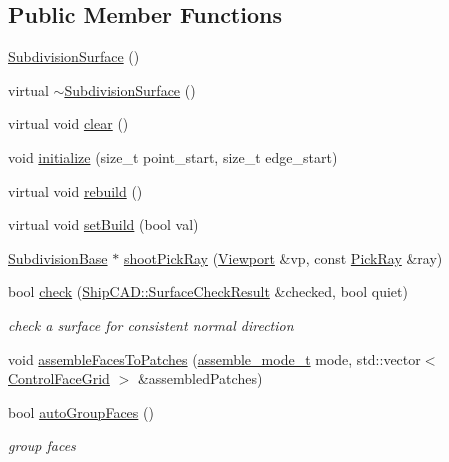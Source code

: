 \subsection*{Public Member Functions}
\begin{DoxyCompactItemize}
\item 
\hyperlink{classShipCAD_1_1SubdivisionSurface_a507ea9cd5354e1d14fe24d52da505934}{Subdivision\+Surface} ()
\item 
virtual \hyperlink{classShipCAD_1_1SubdivisionSurface_a4f1b66a4d9e9f8ac3dbd956e2113a594}{$\sim$\+Subdivision\+Surface} ()
\item 
virtual void \hyperlink{classShipCAD_1_1SubdivisionSurface_a80ab3bd6372a8465d69f71034a353e06}{clear} ()
\item 
void \hyperlink{classShipCAD_1_1SubdivisionSurface_a13cfd2714344c9b85aad8d123538db48}{initialize} (size\+\_\+t point\+\_\+start, size\+\_\+t edge\+\_\+start)
\item 
virtual void \hyperlink{classShipCAD_1_1SubdivisionSurface_a259856fc21f2bc1eebbc52f10dd59469}{rebuild} ()
\item 
virtual void \hyperlink{classShipCAD_1_1SubdivisionSurface_aec5073750762d1f8c3ab2107a742f4a5}{set\+Build} (bool val)
\item 
\hyperlink{classShipCAD_1_1SubdivisionBase}{Subdivision\+Base} $\ast$ \hyperlink{classShipCAD_1_1SubdivisionSurface_aee7768d40a54b2d22cf604dedeec4bbc}{shoot\+Pick\+Ray} (\hyperlink{classShipCAD_1_1Viewport}{Viewport} \&vp, const \hyperlink{structShipCAD_1_1PickRay}{Pick\+Ray} \&ray)
\item 
bool \hyperlink{classShipCAD_1_1SubdivisionSurface_a8092913bd49a8a98cf96ba9485758aaf}{check} (\hyperlink{structShipCAD_1_1SurfaceCheckResult}{Ship\+C\+A\+D\+::\+Surface\+Check\+Result} \&checked, bool quiet)
\begin{DoxyCompactList}\small\item\em check a surface for consistent normal direction \end{DoxyCompactList}\item 
void \hyperlink{classShipCAD_1_1SubdivisionSurface_ab14892e66e800a795e1af3dcc781af02}{assemble\+Faces\+To\+Patches} (\hyperlink{namespaceShipCAD_aaba70dc1c80dc540bef320cb9b720a20}{assemble\+\_\+mode\+\_\+t} mode, std\+::vector$<$ \hyperlink{structShipCAD_1_1ControlFaceGrid}{Control\+Face\+Grid} $>$ \&assembled\+Patches)
\item 
bool \hyperlink{classShipCAD_1_1SubdivisionSurface_a23fcec4dbb0650c37519b908c63b58ee}{auto\+Group\+Faces} ()
\begin{DoxyCompactList}\small\item\em group faces \end{DoxyCompactList}\item 

\end{DoxyCompactItemize}
